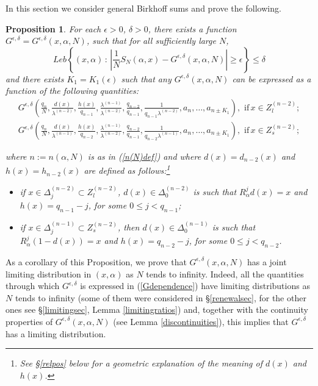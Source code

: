 \documentclass{conm-p-l}
\numberwithin{equation}{section}
\newtheorem{prop}[theorem]{Proposition}
\begin{document}
In this section we consider  general Birkhoff sums and  prove the following.
\begin{prop}\label{generalBSprop}
For each $\epsilon>0$, $\delta > 0 $, there exists a function $G^{\epsilon, \delta } = G^{\epsilon, \delta }(x,\alpha,  N)$, such
that for all sufficiently large $N$,
\begin{equation}\label{Gapproximates}
Leb \left\{ (x ,\alpha ) {\, : \, } \left| \frac{1}{N}  {S_{{N}}({\alpha}, {{x}})} -
G^{\epsilon, \delta }( {x},\alpha,  N) \right| \geq \epsilon \right\} \leq
\delta
\end{equation}
and 
there exists $K_1=K_1(\epsilon )$ such that any $G^{\epsilon, \delta }({x},\alpha,  N )$  can be expressed as a
function  of the following quantities:
\begin{equation}\label{Gdependence}\begin{split}
 G^{\epsilon, \delta} \left(\frac{q_{n}}{N},
\frac{{d(x)}}{\lambda^{(n-2)}}, \frac{h(x)}{q_{n-1}}, \frac{\lambda^{(n-
1)}}{\lambda^{(n-2)} },\frac{q_{n-2}}{q_{n-1}}, \frac{1}{q_{n-1} \lambda^{(n-2)} },  a_n, 
\dots, a_{n\pm  K_1} \right), \, \, \mathrm{if}\, {x}\in  Z^{(n-2)}_l; \\ G^{\epsilon, \delta}\left(\frac{q_{n}}{N},
\frac{{d(x)}}{\lambda^{(n-1)}},  \frac{h(x)}{q_{n-2}}, \frac{\lambda^{(n-
1)}}{\lambda^{(n-2)} },\frac{q_{n-2}}{q_{n-1}},  \frac{1}{q_{n-2} \lambda^{(n- 1)} }, a_n,
\dots, a_{n\pm K_1} \right), 
\, \, \mathrm{if} \, {x}\in  Z^{(n-2)}_s;
\end{split}
\end{equation}

where $n:=n(\alpha,N)$ is as in (\ref{n(N)def}) and where $d(x)=d_{n-2}(x)$ and $h(x)=h_{n-2}(x)$ are defined as follows:\footnote{See \S\ref{relpos} 
 below for a geometric explanation of the meaning of $d(x)$
and $h(x)$.}
\begin{itemize}
\item[-]
 if $x\in \Delta^{(n-2)}_j \subset Z^{(n-2)}_l$, $d(x) \in \Delta^{(n-2)}_0 $ is
such that $R_{\alpha}^j d(x) = x$ and $h(x)=q_{n-1}-j$, for some $0\leq j < q_{n-1}$;
\item[-]
 if $x\in \Delta^{(n-1)}_j \subset Z^{(n-2)}_s$, then $d(x) \in \Delta^{(n-1)}_0
$ is such that $R_{\alpha}^j (1-d(x)) = x$ and $h(x)=q_{n-2}-j$, for some $0\leq j < q_{n-2}$.
\end{itemize}
\end{prop}
As a corollary of this Proposition, we prove that $G^{\epsilon, \delta }({x},\alpha,  N )$ has a joint {limiting} distribution in $(x,\alpha)$ as $N$ tends to infinity.
Indeed, all the quantities through which $G^{\epsilon, \delta}$ is expressed in (\ref{Gdependence}) have
limiting distributions as $N$ tends to infinity (some of them were considered in
\S\ref{renewalsec}, for the other ones see \S\ref{limitingsec}, Lemma
\ref{limitingratios}) and, together with the continuity properties of $G^{\epsilon, \delta }({x},\alpha,  N )$ (see Lemma \ref{discontinuities}),  this implies that
$G^{\epsilon, \delta}$ has a limiting distribution. 
\end{document}
